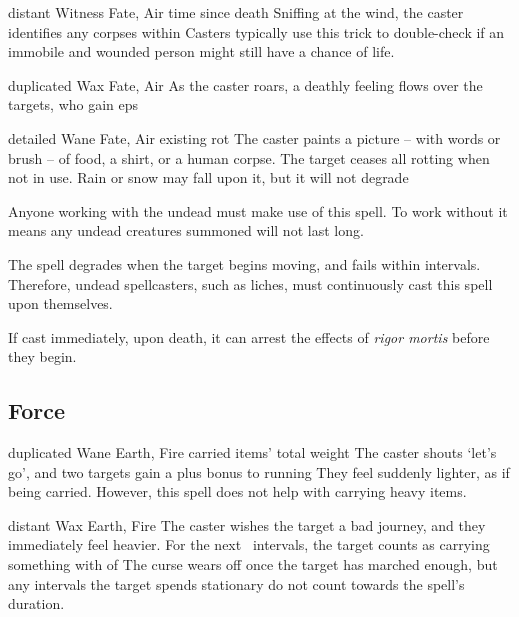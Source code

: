 \begin{multicols}{2}

  {distant}%
  {Witness}%
  {Fate, Air}%
  {time since death}%
  {Sniffing at the wind, the caster identifies any corpses within \spellRange}%
  {
    Casters typically use this trick to double-check if an immobile and wounded person might still have a chance of life.
  }

  {duplicated}%
  {Wax}%
  {Fate, Air}%
  {}%
  {As the caster roars, a deathly feeling flows over the targets, who gain  \glspl{ep}}%
  {}

  {detailed}%
  {Wane}%
  {Fate, Air}%
  {existing rot}%
  {The caster paints a picture -- with words or brush -- of food, a shirt, or a human corpse.
  The target ceases all rotting when not in use.
  Rain or snow may fall upon it, but it will not degrade}%
  {
    Anyone working with the undead must make use of this spell.
    To work without it means any undead creatures summoned will not last long.

    The spell degrades when the target begins moving, and fails within  \glspl{interval}.
    Therefore, undead spellcasters, such as liches, must continuously cast this spell upon themselves.

    If cast immediately, upon death, it can arrest the effects of \textit{rigor mortis} before they begin.
  }

\subsection{Force}


  {duplicated}%
  {Wane}%
  {Earth, Fire}%
  {carried items' total \gls{weight}}%
  {The caster shouts `let's go', and two targets gain a plus  bonus to running}%
  {They feel suddenly lighter, as if being carried.
  However, this spell does not help with carrying heavy items.}

  {distant}%
  {Wax}%
  {Earth, Fire}%
  {}%
  {The caster wishes the target a bad journey, and they immediately feel heavier.
  For the next ~\glspl{interval}, the target counts as carrying something with  of }%
  {
  The curse wears off once the target has marched enough, but any \glspl{interval} the target spends stationary do not count towards the spell's duration.}


\end{multicols}
